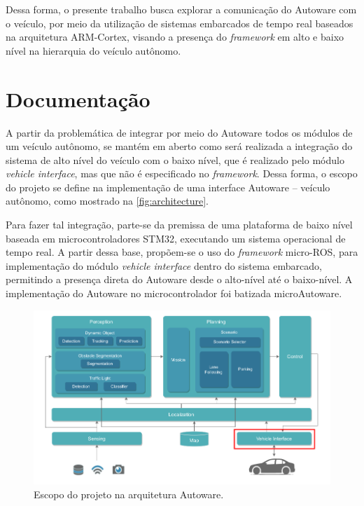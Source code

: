 Dessa forma, o presente trabalho busca explorar a comunicação do Autoware com o veículo, por meio da utilização de sistemas embarcados de tempo real baseados na arquitetura ARM-Cortex, visando a presença do \textit{framework} em alto e baixo nível na hierarquia do veículo autônomo.


\clearpage

\section{Documentação}

A partir da problemática de integrar por meio do Autoware todos os módulos de um veículo autônomo, se mantém em aberto como será realizada a integração do sistema de alto nível do veículo com o baixo nível, que é realizado pelo módulo \textit{vehicle interface}, mas que não é especificado no \textit{framework}. Dessa forma, o escopo do projeto se define na implementação de uma interface Autoware -- veículo autônomo, como mostrado na \autoref{fig:architecture}.

Para fazer tal integração, parte-se da premissa de uma plataforma de baixo nível baseada em microcontroladores STM32, executando um sistema operacional de tempo real. A partir dessa base, propõem-se o uso do \textit{framework} micro-ROS\cite{microros_main}, para implementação do módulo \textit{vehicle interface} dentro do sistema embarcado, permitindo a presença direta do Autoware desde o alto-nível até o baixo-nível. A implementação do Autoware no microcontrolador foi batizada microAutoware.

\begin{figure}[H]
	\centering
	\includegraphics[width=0.75\linewidth]{img/architecture.png}
	\caption{Escopo do projeto na arquitetura Autoware.}
	\label{fig:architecture}
\end{figure}

